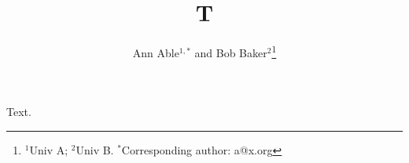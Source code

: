 \documentclass{article}
\begin{document}
\title{T}
\author{Ann Able$^{1,*}$ and Bob Baker$^{2}$\thanks{$^{1}$Univ A; $^{2}$Univ B. $^{*}$Corresponding author: a@x.org}}
\maketitle
Text.
\end{document}

